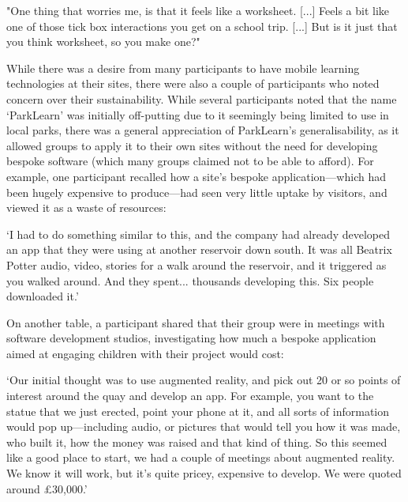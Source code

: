 \begin{displayquote}
"One thing that worries me, is that it feels like a worksheet. [...] Feels a bit like one of those tick box interactions you get on a school trip. [...] But is it just that you think worksheet, so you make one?"
\end{displayquote}

While there was a desire from many participants to have mobile learning technologies at their sites, there were also a couple of participants who noted concern over their sustainability. While several participants noted that the name `ParkLearn' was initially off-putting due to it seemingly being limited to use in local parks, there was a general appreciation of ParkLearn's generalisability, as it allowed groups to apply it to their own sites without the need for developing bespoke software (which many groups claimed not to be able to afford). For example, one participant recalled how a site's bespoke application---which had been hugely expensive to produce---had seen very little uptake by visitors, and viewed it as a waste of resources:

\begin{displayquote}
`I had to do something similar to this, and the company had already developed an app that they were using at another reservoir down south. It was all Beatrix Potter audio, video, stories for a walk around the reservoir, and it triggered as you walked around. And they spent... thousands developing this. Six people downloaded it.'
\end{displayquote}

On another table, a participant shared that their group were in meetings with software development studios, investigating how much a bespoke application aimed at engaging children with their project would cost:

\begin{displayquote}
`Our initial thought was to use augmented reality, and pick out 20 or so points of interest around the quay and develop an app. For example, you want to the statue that we just erected, point your phone at it, and all sorts of information would pop up---including audio, or pictures that would tell you how it was made, who built it, how the money was raised and that kind of thing. So this seemed like a good place to start, we had a couple of meetings about augmented reality. We know it will work, but it's quite pricey, expensive to develop. We were quoted around £30,000.'
\end{displayquote}

